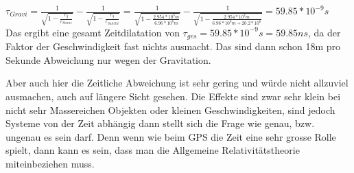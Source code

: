 \begin{refsection}
\( \tau_{Gravi} = \frac{1}{\sqrt{1-\frac{r_g}{r_{Sonne}}}} - \frac{1}{\sqrt{1-\frac{r_g}{r_{Satellit}}}} =  
\frac{1}{\sqrt{1-\frac{2.954 * 10^3m}{6.96 * 10^8m}}} - \frac{1}{\sqrt{1-\frac{2.954 * 10^3m}{ 6.96 * 10^8m + 20.2 * 10^6}}} =  59.85 * 10^{-9}s \)\\

\noindent{}Das ergibt eine gesamt Zeitdilatation von \( \tau_{ges} = 59.85 * 10^{-9}s = 59.85ns \), da der Faktor der Geschwindigkeit fast nichts ausmacht. Das sind dann schon 18m pro Sekunde Abweichung nur wegen der Gravitation. 

Aber auch hier die Zeitliche Abweichung ist sehr gering und würde nicht allzuviel ausmachen, auch auf längere Sicht gesehen. Die Effekte sind zwar sehr klein bei nicht sehr Massereichen Objekten oder kleinen Geschwindigkeiten, sind jedoch Systeme von der Zeit abhängig dann stellt sich die Frage wie genau, bzw. ungenau es sein darf. Denn wenn wie beim GPS die Zeit eine sehr grosse Rolle spielt, dann kann es sein, dass man die Allgemeine Relativitätstheorie miteinbeziehen muss.

\printbibliography[heading=subbibliography]
\end{refsection}

